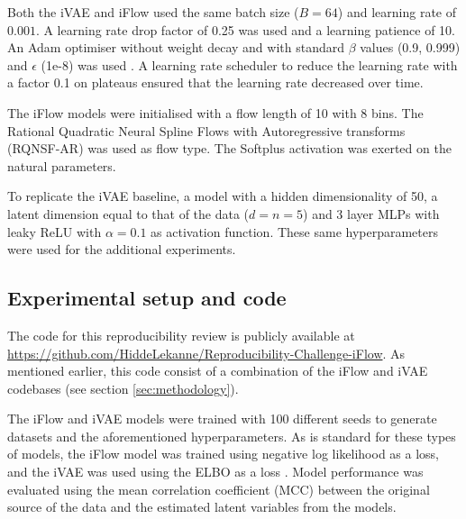 Both the iVAE and iFlow used the same batch size ($B = 64$) and learning rate of $0.001$. A learning rate drop factor of 0.25 was used and a learning patience of 10. An Adam optimiser without weight decay and with standard $\beta$ values (0.9, 0.999) and $\epsilon$ (1e-8) was used \cite{kingma2014adam}. A learning rate scheduler to reduce the learning rate with a factor 0.1 on plateaus ensured that the learning rate decreased over time.

The iFlow models were initialised with a flow length of 10 with 8 bins. The Rational Quadratic Neural Spline Flows with Autoregressive transforms (RQNSF-AR) was used as flow type. The Softplus activation was exerted on the natural parameters.

To replicate the iVAE baseline, a model with a hidden dimensionality of 50, a latent dimension equal to that of the data ($d = n = 5$) and 3 layer MLPs with leaky ReLU with $\alpha = 0.1$ as activation function. These same hyperparameters were used for the additional experiments.

\subsection{Experimental setup and code}
The code for this reproducibility review is publicly available at \url{https://github.com/HiddeLekanne/Reproducibility-Challenge-iFlow}. As mentioned earlier, this code consist of a combination of the iFlow and iVAE codebases (see section \ref{sec:methodology}).

The iFlow and iVAE models were trained with 100 different seeds to generate datasets and the aforementioned hyperparameters. As is standard for these types of models, the iFlow model was trained using negative log likelihood as a loss, and the iVAE was used using the ELBO as a loss \cite{kingma2013auto}.
Model performance was evaluated using the mean correlation coefficient (MCC) between the original source of the data and the estimated latent variables from the models. 

